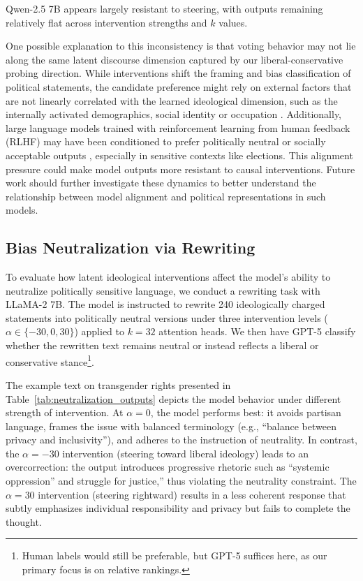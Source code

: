 \documentclass[11pt]{article}
\begin{document}
Qwen-2.5 7B appears largely resistant to steering, with outputs remaining relatively flat across intervention strengths and $k$ values.

One possible explanation to this inconsistency is that voting behavior may not lie along the same latent discourse dimension captured by our liberal-conservative probing direction. While interventions shift the framing and bias classification of political statements, the candidate preference might rely on external factors that are not linearly correlated with the learned ideological dimension, such as the internally activated demographics, social identity or occupation \citep{gaoForecastingElectionsAgentbased2022}. Additionally, large language models trained with reinforcement learning from human feedback (RLHF) may have been conditioned to prefer politically neutral or socially acceptable outputs \citep{potterHiddenPersuadersLLMs2024}, especially in sensitive contexts like elections. This alignment pressure could make model outputs more resistant to causal interventions. Future work should further investigate these dynamics to better understand the relationship between model alignment and political representations in such models.

\subsection{Bias Neutralization via Rewriting}

To evaluate how latent ideological interventions affect the model's ability to neutralize politically sensitive language, we conduct a rewriting task with LLaMA-2 7B. The model is instructed to rewrite 240 ideologically charged statements into politically neutral versions under three intervention levels ($\alpha \in \{-30, 0, 30\}$) applied to $k = 32$ attention heads. We then have GPT-5 classify whether the rewritten text remains neutral or instead reflects a liberal or conservative stance\footnote{Human labels would still be preferable, but GPT-5 suffices here, as our primary focus is on relative rankings.}.

The example text on transgender rights presented in Table~\ref{tab:neutralization_outputs} depicts the model behavior under different strength of intervention. At $\alpha = 0$, the model performs best: it avoids partisan language, frames the issue with balanced terminology (e.g., ``balance between privacy and inclusivity''), and adheres to the instruction of neutrality. In contrast, the $\alpha = -30$ intervention (steering toward liberal ideology) leads to an overcorrection: the output introduces progressive rhetoric such as ``systemic oppression'' and struggle for justice,'' thus violating the neutrality constraint. The $\alpha = 30$ intervention (steering rightward) results in a less coherent response that subtly emphasizes individual responsibility and privacy but fails to complete the thought.
\end{document}
